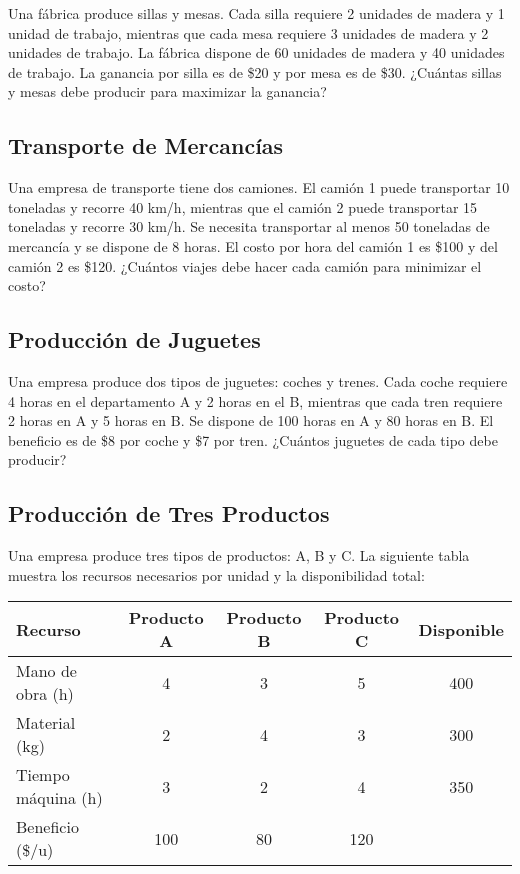 \documentclass[12pt]{article}
\begin{document}
Una fábrica produce sillas y mesas. Cada silla requiere 2 unidades de madera y 1 unidad de trabajo, mientras que cada mesa requiere 3 unidades de madera y 2 unidades de trabajo. La fábrica dispone de 60 unidades de madera y 40 unidades de trabajo. La ganancia por silla es de \$20 y por mesa es de \$30. ¿Cuántas sillas y mesas debe producir para maximizar la ganancia?

\subsection{Transporte de Mercancías}

Una empresa de transporte tiene dos camiones. El camión 1 puede transportar 10 toneladas y recorre 40 km/h, mientras que el camión 2 puede transportar 15 toneladas y recorre 30 km/h. Se necesita transportar al menos 50 toneladas de mercancía y se dispone de 8 horas. El costo por hora del camión 1 es \$100 y del camión 2 es \$120. ¿Cuántos viajes debe hacer cada camión para minimizar el costo?

\subsection{Producción de Juguetes}

Una empresa produce dos tipos de juguetes: coches y trenes. Cada coche requiere 4 horas en el departamento A y 2 horas en el B, mientras que cada tren requiere 2 horas en A y 5 horas en B. Se dispone de 100 horas en A y 80 horas en B. El beneficio es de \$8 por coche y \$7 por tren. ¿Cuántos juguetes de cada tipo debe producir?

\subsection{Producción de Tres Productos}

Una empresa produce tres tipos de productos: A, B y C. La siguiente tabla muestra los recursos necesarios por unidad y la disponibilidad total:

\begin{center}
\begin{tabular}{lcccc}
\toprule
Recurso & Producto A & Producto B & Producto C & Disponible \\
\midrule
Mano de obra (h) & 4 & 3 & 5 & 400 \\
Material (kg) & 2 & 4 & 3 & 300 \\
Tiempo máquina (h) & 3 & 2 & 4 & 350 \\
\midrule
Beneficio (\$/u) & 100 & 80 & 120 & \\
\bottomrule
\end{tabular}
\end{center}
\end{document}

